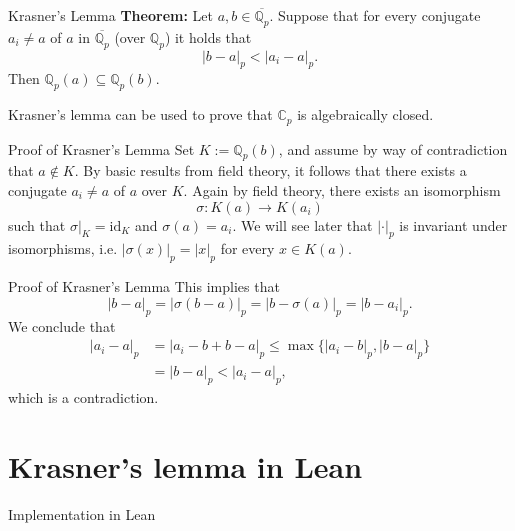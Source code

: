 \documentclass{beamer}
\newcommand{\Q}{\mathbb{Q}}
\newcommand{\C}{\mathbb{C}}
\begin{document}
\begin{frame}{Krasner's Lemma}
    \textbf{Theorem:} Let $a, b \in \overline{\Q_p}$. Suppose that for every conjugate 
    $a_i \neq a$ of $a$ in $\overline{\Q_p}$ (over $\Q_p$) it holds that 
    \begin{equation*}
        |b - a|_p < |a_i - a|_p.
    \end{equation*}
    Then $\Q_p(a) \subseteq \Q_p(b)$.
    \pause 

    \bigskip 
    Krasner's lemma can be used to prove that $\C_p$ is algebraically closed.
\end{frame}

\begin{frame}{Proof of Krasner's Lemma}
    Set $K := \Q_p(b)$, and assume by way of contradiction that $a \notin K$. \pause By basic results from field theory, it follows that there exists a conjugate $a_i \neq a$ of $a$ over $K$. \pause Again by field theory, there exists an isomorphism 
    \begin{equation*}
        \sigma \colon K(a) \to K(a_i)
    \end{equation*}
    such that $\sigma|_K = \mathrm{id}_K$ and $\sigma(a) = a_i$. \pause We will see later that 
    $|\cdot|_p$ is invariant under isomorphisms, i.e. $|\sigma(x)|_p = |x|_p$ for every $x \in K(a)$. 
\end{frame}

\begin{frame}{Proof of Krasner's Lemma}
    This implies that
    \begin{equation*}
        |b - a|_p = |\sigma(b - a)|_p = |b - \sigma(a)|_p = |b - a_i|_p.
    \end{equation*}
    \pause
    We conclude that 
    \begin{align*}
        |a_i - a|_p &= |a_i - b + b - a|_p \leq \max\{|a_i - b|_p, |b - a|_p\} \\ 
        &= |b - a|_p < |a_i - a|_p,
    \end{align*}
    which is a contradiction.
\end{frame}
\section{Krasner's lemma in Lean}
\begin{frame}{Implementation in Lean}
    
\end{frame}
\end{document}
